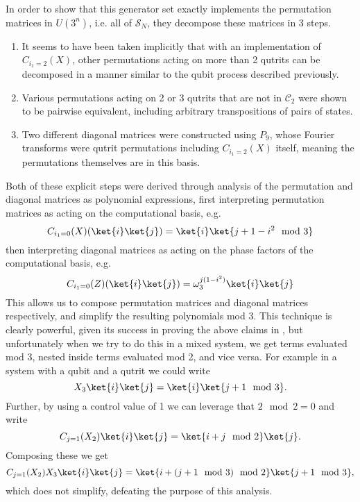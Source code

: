 In order to show that this generator set exactly implements the permutation matrices in $U\left(3^n\right)$, i.e. all of $\mathcal{S}_{N}$, they decompose these matrices in 3 steps.
\begin{enumerate}
	\item It seems to have been taken implicitly that with an implementation of $C_{i_1 = 2}(X)$, other permutations acting on more than 2 qutrits can be decomposed in a manner similar to the qubit process described previously.
	\item Various permutations acting on 2 or 3 qutrits that are not in $\mathcal{C}_2$ were shown to be pairwise equivalent, including arbitrary transpositions of pairs of states.
	\item Two different diagonal matrices were constructed using $P_9$, whose Fourier transforms were qutrit permutations including $C_{i_1=2}(X)$ itself, meaning the permutations themselves are in this basis.
\end{enumerate}

Both of these explicit steps were derived through analysis of the permutation and diagonal matrices as polynomial expressions, first interpreting permutation matrices as acting on the computational basis, e.g.
\[C_{i_1=0}(X)(\ket{i}\ket{j}) = \ket{i}\ket{j+1-i^2 \mod 3}\]
then interpreting diagonal matrices as acting on the phase factors of the computational basis, e.g.
\[C_{i_1=0}(Z)(\ket{i}\ket{j}) = \omega_{3}^{j(1-i^2)}\ket{i}\ket{j}\]
This allows us to compose permutation matrices and diagonal matrices respectively, and simplify the resulting polynomials mod 3. This technique is clearly powerful, given its success in proving the above claims in \cite{arithmetics}, but unfortunately when we try to do this in a mixed system, we get terms evaluated mod 3, nested inside terms evaluated mod 2, and vice versa. For example in a system with a qubit and a qutrit we could write
\[X_3\ket{i}\ket{j} = \ket{i}\ket{j+1\mod 3}.\]
Further, by using a control value of 1 we can leverage that $2 \mod 2 = 0$ and write
\[C_{j=1}(X_2)\ket{i}\ket{j} = \ket{i+j \mod 2}\ket{j}.\]
Composing these we get
\[C_{j=1}(X_2)X_3\ket{i}\ket{j} = \ket{i+(j+1 \mod 3)\mod 2}\ket{j + 1 \mod 3},\]
which does not simplify, defeating the purpose of this analysis. 

